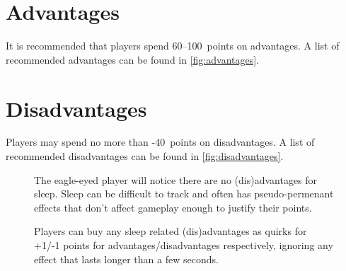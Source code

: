 \section{Advantages}
\label{sec:advantages}

It is recommended that players spend 60--100~points on advantages. A list of
recommended advantages can be found in \autoref{fig:advantages}.

\section{Disadvantages}
\label{sec:disadvantages}

Players may spend no more than -40~points on disadvantages. A list of
recommended disadvantages can be found in \autoref{fig:disadvantages}.




\begin{figure}[b]
  \centering
  \begin{tcolorbox}[title={Where are the sleep (dis)advantages?}]
    The eagle-eyed player will notice there are no (dis)advantages for sleep.
    Sleep can be difficult to track and often has pseudo-permenant effects that
    don't affect gameplay enough to justify their points.

    Players can buy any sleep related (dis)advantages as quirks for +1/-1 points for
    advantages/disadvantages respectively, ignoring any effect that lasts longer
    than a few seconds.
    
  \end{tcolorbox}
\end{figure}


